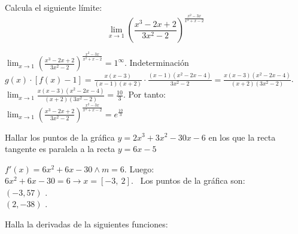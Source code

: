 \documentclass[addpoints,spanish, 12pt,a4paper]{exam}
\begin{document}
\begin{questions}

%
%
%

\question[6] Calcula el siguiente límite: $$\lim_{x \to 1} \left(\frac{x^{3} - 2 x + 2}{3 x^{2} - 2}\right)^{\frac{x^{2} - 3 x}{x^{2} + x - 2}}$$
\begin{solution}
$\lim_{x \to 1} \left(\frac{x^{3} - 2 x + 2}{3 x^{2} - 2}\right)^{\frac{x^{2} - 3 x}{x^{2} + x - 2}}=1^\infty$. Indeterminación \\ $g(x)\cdot\left[f(x)-1\right]=\frac{x \left(x - 3\right)}{\left(x - 1\right) \left(x + 2\right)}\cdot\frac{\left(x - 1\right) \left(x^{2} - 2 x - 4\right)}{3 x^{2} - 2}=\frac{x \left(x - 3\right) \left(x^{2} - 2 x - 4\right)}{\left(x + 2\right) \left(3 x^{2} - 2\right)}$. \\ $\lim_{x \to 1}\frac{x \left(x - 3\right) \left(x^{2} - 2 x - 4\right)}{\left(x + 2\right) \left(3 x^{2} - 2\right)}=\frac{10}{3}$. Por tanto: \\ $\lim_{x \to 1} \left(\frac{x^{3} - 2 x + 2}{3 x^{2} - 2}\right)^{\frac{x^{2} - 3 x}{x^{2} + x - 2}}=e^{\frac{10}{3}}$

\end{solution}
\addpoints

\question[4] Hallar los puntos de la gráfica $y=2 x^{3} + 3 x^{2} - 30 x - 6$ en los que la recta tangente es paralela a la recta $y=6 x - 5$
\begin{solution}$f'(x)=6 x^{2} + 6 x - 30\land m=6$. Luego: \\ $6 x^{2} + 6 x - 30 = 6 \to x =\left[ -3, \  2\right] $. \ Los puntos de la gráfica son: \\   $\left(-3,57 \right)$ . \\  $\left(2,-38 \right)$ . \\ 
\end{solution}
\addpoints

\question Halla la derivadas de la siguientes funciones:

\end{questions}
\end{document}
